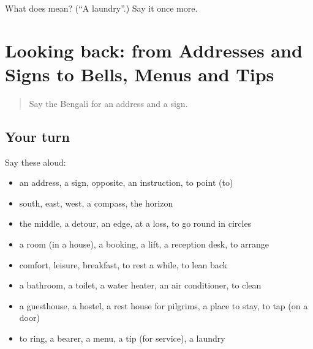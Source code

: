 \begin{tcolorbox}[breakable,colback=teal!4,colframe=teal!35!black,title={Before you move on}]
What does  mean? (\textquotedblleft{}A laundry\textquotedblright{}.) Say it once more.
\end{tcolorbox}
\section[(dialogue)]{Looking back: from Addresses and Signs to Bells, Menus and Tips}

\label{lesson:BN-R407-review-400-407}



\begin{quote}
Say the Bengali for an address and a sign.
\end{quote}

\subsection*{Your turn}
Say these aloud:

\begin{itemize}
\raggedright
  \item an address, a sign, opposite, an instruction, to point (to)
  \item south, east, west, a compass, the horizon
  \item the middle, a detour, an edge, at a loss, to go round in circles
  \item a room (in a house), a booking, a lift, a reception desk, to arrange
  \item comfort, leisure, breakfast, to rest a while, to lean back
  \item a bathroom, a toilet, a water heater, an air conditioner, to clean
  \item a guesthouse, a hostel, a rest house for pilgrims, a place to stay, to tap (on a door)
  \item to ring, a bearer, a menu, a tip (for service), a laundry
\end{itemize}

